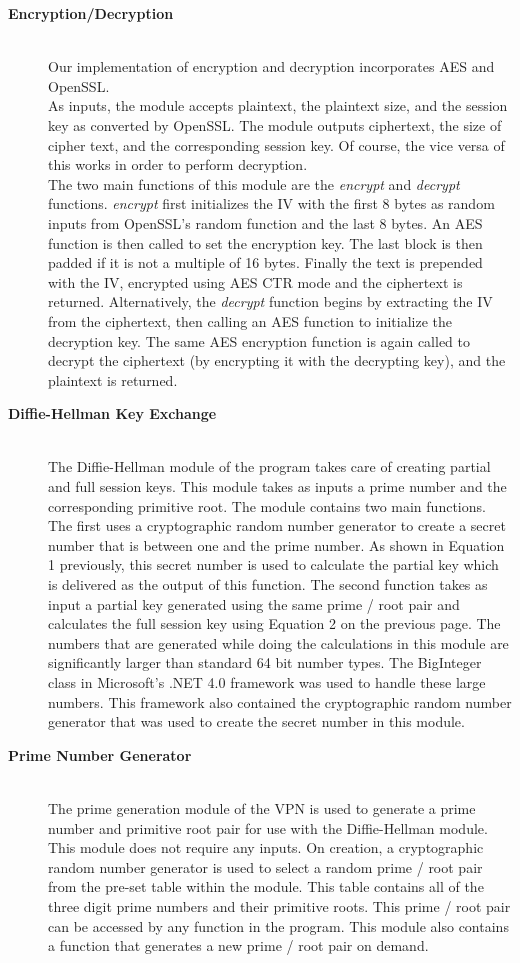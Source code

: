 \documentclass[journal]{IEEEtran}
\begin{document}
\begin{description}
	\item[\bfseries Encryption/Decryption] \hfill \\
	Our implementation of encryption and decryption incorporates AES and OpenSSL.\\
	As inputs, the module accepts plaintext, the plaintext size, and the session key as converted by OpenSSL. The module outputs ciphertext, the size of cipher text, and the corresponding session key. Of course, the vice versa of this works in order to perform decryption.\\
	The two main functions of this module are the \emph{encrypt} and \emph{decrypt} functions. \emph{encrypt} first initializes the IV with the first 8 bytes as random inputs from OpenSSL's random function and the last 8 bytes. An AES function is then called to set the encryption key. The last block is then padded if it is not a multiple of 16 bytes. Finally the text is prepended with the IV, encrypted using AES CTR mode and the ciphertext is returned. Alternatively, the \emph{decrypt} function begins by extracting the IV from the ciphertext, then calling an AES function to initialize the decryption key. The same AES encryption function is again called to decrypt the ciphertext (by encrypting it with the decrypting key), and the plaintext is returned.
	
	\item[\bfseries Diffie-Hellman Key Exchange] \hfill \\
	The Diffie-Hellman module of the program takes care of creating partial and full session keys. This module takes as inputs a prime number and the corresponding primitive root. The module contains two main functions. The first uses a cryptographic random number generator to create a secret number that is between one and the prime number. As shown in Equation 1 previously, this secret number is used to calculate the partial key which is delivered as the output of this function. The second function takes as input a partial key generated using the same prime / root pair and calculates the full session key using Equation 2 on the previous page.
	The numbers that are generated while doing the calculations in this module are significantly larger than standard 64 bit number types. The BigInteger class in Microsoft's .NET 4.0 framework was used to handle these large numbers. This framework also contained the cryptographic random number generator that was used to create the secret number in this module. 
	
	\item[\bfseries Prime Number Generator] \hfill \\
	The prime generation module of the VPN is used to generate a prime number and primitive root pair for use with the Diffie-Hellman module. This module does not require any inputs. On creation, a cryptographic random number generator is used to select a random prime / root pair from the pre-set table within the module. This table contains all of the three digit prime numbers and their primitive roots. This prime / root pair can be accessed by any function in the program. This module also contains a function that generates a new prime / root pair on demand.
	

\end{description}
\end{document}
